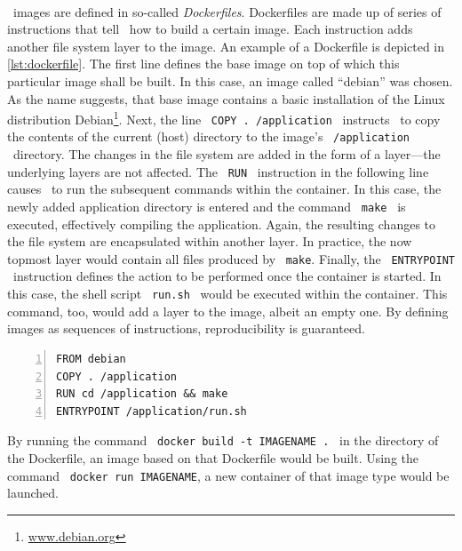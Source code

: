 \paragraph{}
\docker\ images are defined in so-called \emph{Dockerfiles}. Dockerfiles are made up of series of instructions that tell \docker\ how to build a certain image. Each instruction adds another file system layer to the image. An example of a Dockerfile is depicted in \autoref{lst:dockerfile}. The first line defines the base image on top of which this particular image shall be built. In this case, an image called ``debian'' was chosen. As the name suggests, that base image contains a basic installation of the Linux distribution Debian\footnote{\url{www.debian.org}}. Next, the line \ \texttt{COPY . /application} \ instructs \docker\ to copy the contents of the current (host) directory to the image's \ \texttt{/application} \ directory. The changes in the file system are added in the form of a layer---the underlying layers are not affected. The \ \texttt{RUN} \ instruction in the following line causes \docker\ to run the subsequent commands within the container. In this case, the newly added application directory is entered and the command \ \texttt{make} \ is executed, effectively compiling the application. Again, the resulting changes to the file system are encapsulated within another layer. In practice, the now topmost layer would contain all files produced by \ \texttt{make}. Finally, the \ \texttt{ENTRYPOINT} \ instruction defines the action to be performed once the container is started. In this case, the shell script \ \texttt{run.sh} \ would be executed within the container. This command, too, would add a layer to the image, albeit an empty one. By defining images as sequences of instructions, reproducibility is guaranteed.
\begin{lstlisting}[caption=An examplary Dockerfile, label=lst:dockerfile, numbers=left, numberstyle=\tiny]
FROM debian
COPY . /application
RUN cd /application && make
ENTRYPOINT /application/run.sh
\end{lstlisting}
By running the command \ \mbox{\texttt{docker build -t IMAGENAME .}} \ in the directory of the Dockerfile, an image based on that Dockerfile would be built. Using the command \ \texttt{docker run IMAGENAME}, a new container of that image type would be launched.




